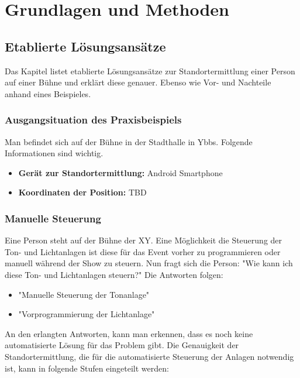 
\pagestyle{fancy} \frenchspacing
\renewcommand{\chaptermark}[1]{\markboth{#1}{}}

\renewcommand{\textfraction}{0}
\renewcommand{\floatpagefraction}{0.999}
\renewcommand{\topfraction}{0.7}
\renewcommand{\bottomfraction}{0.999}
\lfoot{}

\chapter{Grundlagen und Methoden}

\section{Etablierte Lösungsansätze}
Das Kapitel listet etablierte Lösungsansätze zur Standortermittlung einer Person auf einer Bühne und erklärt diese genauer. Ebenso wie Vor- und Nachteile anhand eines Beispieles.

\subsection{Ausgangsituation des Praxisbeispiels}

Man befindet sich auf der Bühne in der Stadthalle in Ybbs. Folgende Informationen sind wichtig.
\begin{itemize}
	\item \textbf{Gerät zur Standortermittlung: } Android Smartphone
	\item \textbf{Koordinaten der Position: } TBD  
\end{itemize}

\subsection{Manuelle Steuerung}
Eine Person steht auf der Bühne der XY. Eine Möglichkeit die Steuerung der Ton- und Lichtanlagen ist diese für das Event vorher zu programmieren oder manuell während der Show zu steuern. Nun fragt sich die Person: "Wie kann ich diese Ton- und Lichtanlagen steuern?" Die Antworten folgen:

\begin{itemize}
	\item "Manuelle Steuerung der Tonanlage"
	\item "Vorprogrammierung der Lichtanlage"
\end{itemize}

An den erlangten Antworten, kann man erkennen, dass es noch keine automatisierte Lösung für das Problem gibt. Die Genauigkeit der Standortermittlung, die für die automatisierte Steuerung der Anlagen notwendig ist, kann in folgende Stufen eingeteilt werden: 

